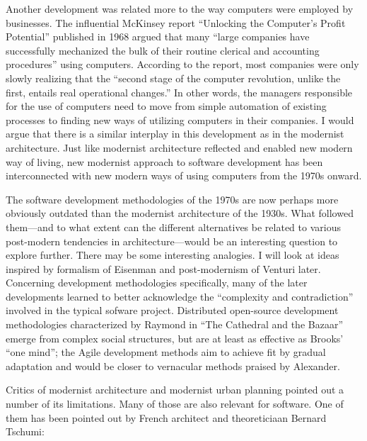Another development was related more to the way computers were employed by businesses.
The influential McKinsey report ``Unlocking the Computer's Profit Potential''
published in 1968 argued that many ``large companies have successfully mechanized the bulk
of their routine clerical and accounting procedures'' using computers. According to the report,
most companies were only slowly realizing that the ``second stage of the computer revolution,
unlike the first, entails real operational changes.''
In other words, the managers responsible for the use of computers need to move from simple
automation of existing processes to finding new ways of utilizing computers in their companies.
I would argue that there is a similar interplay in this development as in the modernist
architecture. Just like modernist architecture reflected and enabled new modern way of living,
new modernist approach to software development has been interconnected with new modern ways
of using computers from the 1970s onward.

The software development methodologies of the 1970s are now perhaps more obviously outdated
than the modernist architecture of the 1930s. What followed them---and to what extent can the
different alternatives be related to various post-modern tendencies in architecture---would be
an interesting question to explore further. There may be some interesting analogies.
I will look at ideas inspired by formalism of Eisenman and post-modernism of Venturi later.
Concerning development methodologies specifically, many of the later developments learned to
better acknowledge the ``complexity and contradiction'' involved in the typical sofware project.
Distributed open-source development methodologies characterized by Raymond in ``The Cathedral and
the Bazaar'' emerge from complex social structures, but are at least as effective
as Brooks' ``one mind''; the Agile development methods aim to achieve fit by gradual adaptation
and would be closer to vernacular methods praised by Alexander.


Critics of modernist architecture and modernist urban planning pointed out a number
of its limitations. Many of those are also relevant for software. One of them has been
pointed out by French architect and theoreticiaan Bernard Tschumi:

